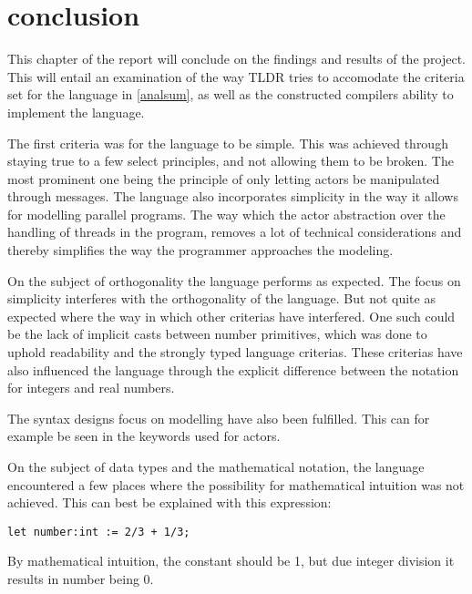 \chapter{conclusion}

This chapter of the report will conclude on the findings and results of the project. This will entail an examination of the way TLDR tries to accomodate the criteria set for the language in \cref{analsum}, as well as the constructed compilers ability to implement the language.

The first criteria was for the language to be simple. This was achieved through staying true to a few select principles, and not allowing them to be broken. The most prominent one being the principle of only letting actors be manipulated through messages. The language also incorporates simplicity in the way it allows for modelling parallel programs. The way which the actor abstraction over the handling of threads in the program, removes a lot of technical considerations and thereby simplifies the way the programmer approaches the modeling.
 
On the subject of orthogonality the language performs as expected. The focus on simplicity interferes with the orthogonality of the language. But not quite as expected where the way in which other criterias have interfered. One such could be the lack of implicit casts between number primitives, which was done to uphold readability and the strongly typed language criterias. These criterias have also influenced the language through the explicit difference between the notation for integers and real numbers.

The syntax designs focus on modelling have also been fulfilled. This can for example be seen in the keywords used for actors.

On the subject of data types and the mathematical notation, the language encountered a few places where the possibility for mathematical intuition was not achieved. This can best be explained with this expression:

\begin{lstlisting}
let number:int := 2/3 + 1/3;
\end{lstlisting}

By mathematical intuition, the constant should be 1, but due integer division it results in number being 0.







